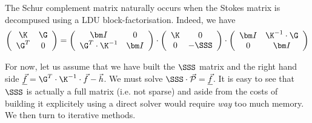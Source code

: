 \begin{remark}
The Schur complement matrix naturally occurs when the Stokes matrix is decompused using 
a LDU block-factorisation. Indeed, we have 
\[
\left(
\begin{array}{cc}
\K & \G \\ 
\G^T & 0
\end{array}
\right)
=
\left(
\begin{array}{cc}
{\bm I} & 0 \\ 
\G^T \cdot \K^{-1} & {\bm I}
\end{array}
\right)
\cdot
\left(
\begin{array}{cc}
\K & 0 \\ 
0 & -\SSS
\end{array}
\right)
\cdot
\left(
\begin{array}{cc}
{\bm I} & \K^{-1} \cdot \G \\ 
0 & {\bm I}
\end{array}
\right)
\]
\end{remark}

For now, let us assume that we have built the $\SSS$ matrix and the right hand 
side $\underline{\vec{f}}=\G^T \cdot \K^{-1} \cdot \vec{f} - \vec{h}$.
We must solve $\SSS\cdot \vec{\cal P} = \underline{\vec{f}}$.
It is easy to see that $\SSS$ is actually a full matrix (i.e. not sparse) and 
aside from the costs of building it explicitely using a direct solver would require {\it way}
too much memory. We then turn to iterative methods. 

